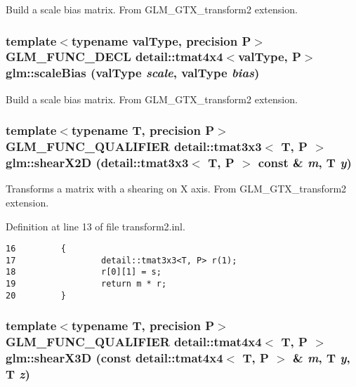 Build a scale bias matrix. From GLM\_\-GTX\_\-transform2 extension. \hypertarget{group__gtx__transform2_gd75c85daca353804c161589fe32ce107}{
\subsubsection[scaleBias]{\setlength{\rightskip}{0pt plus 5cm}template$<$typename valType, precision P$>$ GLM\_\-FUNC\_\-DECL detail::tmat4x4$<$valType, P$>$ glm::scaleBias (valType {\em scale}, \/  valType {\em bias})}}
\label{group__gtx__transform2_gd75c85daca353804c161589fe32ce107}


Build a scale bias matrix. From GLM\_\-GTX\_\-transform2 extension. \hypertarget{group__gtx__transform2_gb571921ddab480d5cd402b5f3e325fb7}{
\subsubsection[shearX2D]{\setlength{\rightskip}{0pt plus 5cm}template$<$typename T, precision P$>$ GLM\_\-FUNC\_\-QUALIFIER detail::tmat3x3$<$ T, P $>$ glm::shearX2D (detail::tmat3x3$<$ T, P $>$ const \& {\em m}, \/  T {\em y})}}
\label{group__gtx__transform2_gb571921ddab480d5cd402b5f3e325fb7}


Transforms a matrix with a shearing on X axis. From GLM\_\-GTX\_\-transform2 extension. 

Definition at line 13 of file transform2.inl.

\begin{Code}\begin{verbatim}16         {
17                 detail::tmat3x3<T, P> r(1);
18                 r[0][1] = s;
19                 return m * r;
20         }
\end{verbatim}
\end{Code}


\hypertarget{group__gtx__transform2_ga091ba9f8bd59949adaf8ed5d4ec52ed}{
\subsubsection[shearX3D]{\setlength{\rightskip}{0pt plus 5cm}template$<$typename T, precision P$>$ GLM\_\-FUNC\_\-QUALIFIER detail::tmat4x4$<$ T, P $>$ glm::shearX3D (const detail::tmat4x4$<$ T, P $>$ \& {\em m}, \/  T {\em y}, \/  T {\em z})}}
\label{group__gtx__transform2_ga091ba9f8bd59949adaf8ed5d4ec52ed}


